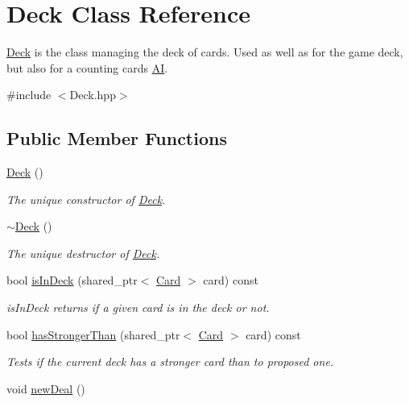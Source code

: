 \hypertarget{classDeck}{\section{\-Deck \-Class \-Reference}
\label{classDeck}
}


\hyperlink{classDeck}{\-Deck} is the class managing the deck of cards. \-Used as well as for the game deck, but also for a counting cards \hyperlink{classAI}{\-A\-I}.  




{\ttfamily \#include $<$\-Deck.\-hpp$>$}

\subsection*{\-Public \-Member \-Functions}
\begin{DoxyCompactItemize}
\item 
\hypertarget{classDeck_a57ae1cb4ac6fd61c249cefb2db85eb99}{\hyperlink{classDeck_a57ae1cb4ac6fd61c249cefb2db85eb99}{\-Deck} ()}\label{classDeck_a57ae1cb4ac6fd61c249cefb2db85eb99}

\begin{DoxyCompactList}\small\item\em \-The unique constructor of \hyperlink{classDeck}{\-Deck}. \end{DoxyCompactList}\item 
\hypertarget{classDeck_a7d1331cc558c302fdf44e5ae8aae1a95}{\hyperlink{classDeck_a7d1331cc558c302fdf44e5ae8aae1a95}{$\sim$\-Deck} ()}\label{classDeck_a7d1331cc558c302fdf44e5ae8aae1a95}

\begin{DoxyCompactList}\small\item\em \-The unique destructor of \hyperlink{classDeck}{\-Deck}. \end{DoxyCompactList}\item 
bool \hyperlink{classDeck_aaafdac9dd57ada20cc78dd330c741963}{is\-In\-Deck} (shared\-\_\-ptr$<$ \hyperlink{classCard}{\-Card} $>$ card) const 
\begin{DoxyCompactList}\small\item\em is\-In\-Deck returns if a given card is in the deck or not. \end{DoxyCompactList}\item 
bool \hyperlink{classDeck_a82a3371b10b8be7bc5fef6999a56bb88}{has\-Stronger\-Than} (shared\-\_\-ptr$<$ \hyperlink{classCard}{\-Card} $>$ card) const 
\begin{DoxyCompactList}\small\item\em \-Tests if the current deck has a stronger card than to proposed one. \end{DoxyCompactList}\item 
\hypertarget{classDeck_aec4d8d2a67f1c46a1a7f175b8848f5b6}{void \hyperlink{classDeck_aec4d8d2a67f1c46a1a7f175b8848f5b6}{new\-Deal} ()}\label{classDeck_aec4d8d2a67f1c46a1a7f175b8848f5b6}


\end{DoxyCompactItemize}
